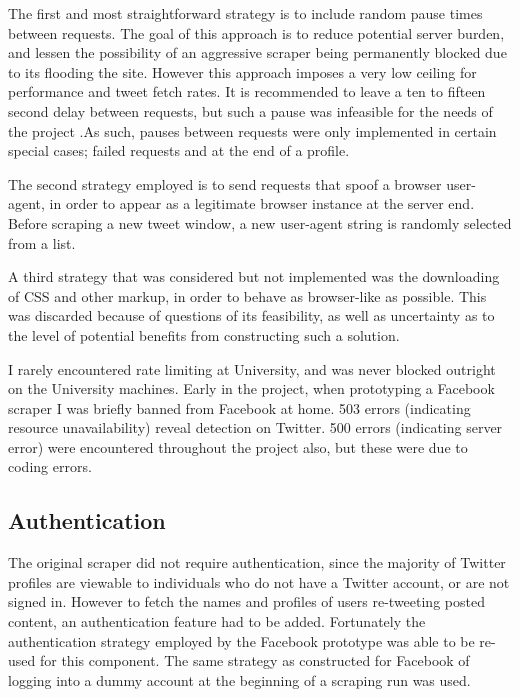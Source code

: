 The first and most straightforward strategy is to include random pause times between requests. The goal of this approach is to reduce potential server burden, and lessen the possibility of an aggressive scraper being permanently blocked due to its flooding the site. However this approach imposes a very low ceiling for performance and tweet fetch rates. It is recommended to leave a ten to fifteen second delay between requests, but such a pause was infeasible for the needs of the project \cite{howto_scrape}.As such, pauses between requests were only implemented in certain special cases; failed requests and at the end of a profile. 

The second strategy employed is to send requests that spoof a browser user-agent, in order to appear as a legitimate browser instance at the server end. Before scraping a new tweet window, a new user-agent string is randomly selected from a list. 

A third strategy that was considered but not implemented was the downloading of CSS and other markup, in order to behave as browser-like as possible. This was discarded because of questions of its feasibility, as well as uncertainty as to the level of potential benefits from constructing such a solution. 

I rarely encountered rate limiting at University, and was never blocked outright on the University machines. Early in the project, when prototyping a Facebook scraper I was briefly banned from Facebook at home. 503 errors (indicating resource unavailability) reveal detection on Twitter. 500 errors (indicating server error)  were encountered throughout the project also, but these were due to coding errors. 

\subsection{Authentication}

The original scraper did not require authentication, since the majority of Twitter profiles are viewable to individuals who do not have a Twitter account, or are not signed in. However to fetch the names and profiles of users re-tweeting posted content, an authentication feature had to be added. Fortunately the authentication strategy employed by the Facebook prototype was able to be re-used for this component. The same strategy as constructed for Facebook of logging into a dummy account at the beginning of a scraping run was used.  

